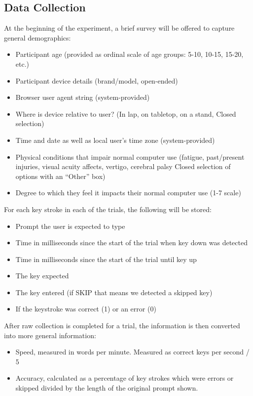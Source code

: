 \documentclass[english]{vgtc}
\begin{document}
\subsection{Data Collection}

At the beginning of the experiment, a brief survey will be offered
to capture general demographics: 
\begin{itemize}
\item Participant age (provided as ordinal scale of age groups: 5-10, 10-15,
15-20, etc.) 
\item Participant device details (brand/model, open-ended) 
\item Browser user agent string (system-provided) 
\item Where is device relative to user? (In lap, on tabletop, on a stand,
Closed selection)
\item Time and date as well as local user\textquoteright s time zone (system-provided)
\item Physical conditions that impair normal computer use (fatigue, past/present
injuries, visual acuity affects, vertigo, cerebral palsy Closed selection
of options with an \textquotedblleft Other\textquotedblright{} box) 
\item Degree to which they feel it impacts their normal computer use (1-7
scale)
\end{itemize}
For each key stroke in each of the trials, the following will be stored: 
\begin{itemize}
\item Prompt the user is expected to type 
\item Time in milliseconds since the start of the trial when key down was
detected 
\item Time in milliseconds since the start of the trial until key up 
\item The key expected 
\item The key entered (if SKIP that means we detected a skipped key) 
\item If the keystroke was correct (1) or an error (0) 
\end{itemize}
After raw collection is completed for a trial, the information is
then converted into more general information: 
\begin{itemize}
\item Speed, measured in words per minute. Measured as correct keys per second / 5
\item Accuracy, calculated as a percentage of key strokes which were errors or skipped
divided by the length of the original prompt shown. 
\end{itemize}
\end{document}
